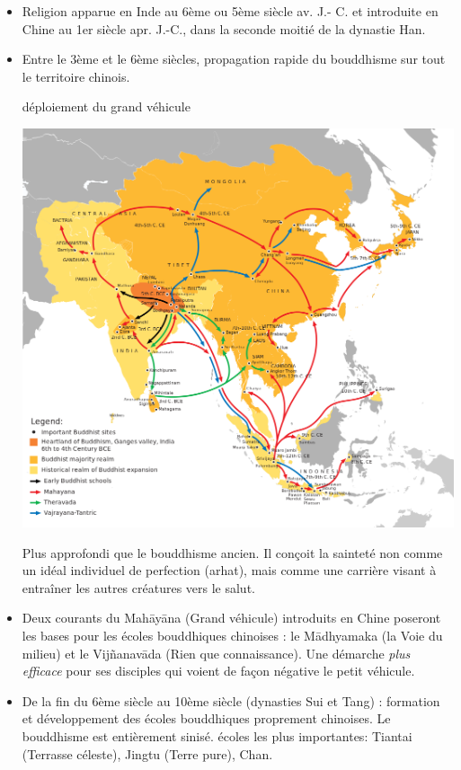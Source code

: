 \begin{itemize}
 \item 	Religion apparue en Inde au 6ème ou 5ème siècle av. J.- C. et introduite en Chine au 1er siècle apr. J.-C., dans la seconde moitié de la dynastie Han.
 \item 	Entre le 3ème et le 6ème siècles, propagation rapide du bouddhisme sur tout le territoire chinois.
 
 \begin{marginfigure}
 \caption{déploiement du grand véhicule}
     \includegraphics[width=\textwidth]{ConfucianismeTaoismeBouddhismeChinois/Images/Buddhist_Expansion.png}
 \end{marginfigure}
 \begin{Def}
    Plus approfondi que le bouddhisme ancien.   Il conçoit la sainteté non comme un idéal individuel de perfection (arhat), mais comme une carrière visant à entraîner les autres créatures vers le salut.  
\end{Def}
 \item Deux courants du Mahāyāna (Grand véhicule) introduits en Chine poseront les bases pour les écoles bouddhiques chinoises : le Mādhyamaka (la Voie du milieu) et le Vijñanavāda (Rien que
connaissance). Une démarche \textit{plus efficace} pour ses disciples qui voient de façon négative le petit véhicule. 

 \item De la fin du 6ème siècle au 10ème siècle (dynasties Sui et Tang) : formation et développement des écoles bouddhiques proprement chinoises. Le bouddhisme est entièrement sinisé.
écoles les plus importantes: Tiantai (Terrasse céleste), Jingtu (Terre pure), Chan.
\end{itemize}


